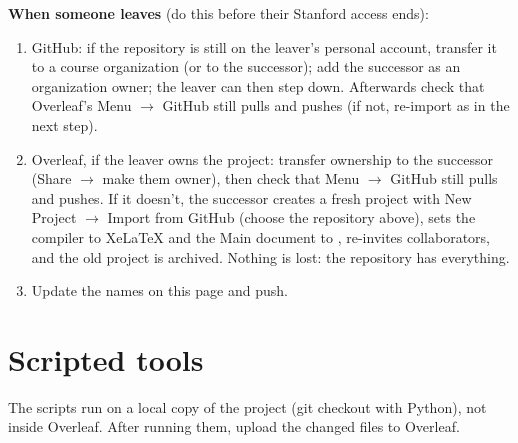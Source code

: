 \documentclass[11pt]{article}
\let\f\path                                     %
\begin{document}
\textbf{When someone leaves} (do this before their Stanford access ends):
\begin{enumerate}
  \item GitHub: if the repository is still on the leaver's personal account, transfer it to a
        course organization (or to the successor); add the successor as an organization owner;
        the leaver can then step down. Afterwards check that Overleaf's Menu $\rightarrow$ GitHub
        still pulls and pushes (if not, re-import as in the next step).
  \item Overleaf, if the leaver owns the project: transfer ownership to the successor
        (Share $\rightarrow$ make them owner), then check that Menu $\rightarrow$ GitHub still
        pulls and pushes. If it doesn't, the successor creates a fresh project with
        New Project $\rightarrow$ Import from GitHub (choose the repository above), sets the
        compiler to XeLaTeX and the Main document to \f{README.tex}, re-invites collaborators, and
        the old project is archived. Nothing is lost: the repository has everything.
  \item Update the names on this page and push.
\end{enumerate}

\section{Scripted tools}\label{sec:tools}

The scripts run on a local copy of the project (git checkout with Python), not inside Overleaf.
After running them, upload the changed files to Overleaf.
\end{document}
